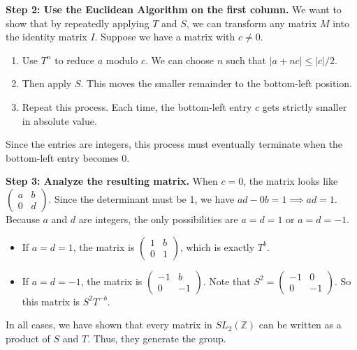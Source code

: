 \begin{solution}
\textbf{Step 2: Use the Euclidean Algorithm on the first column.}
We want to show that by repeatedly applying $T$ and $S$, we can transform any matrix $M$ into the identity matrix $I$.
Suppose we have a matrix with $c \neq 0$.
\begin{enumerate}
    \item Use $T^n$ to reduce $a$ modulo $c$. We can choose $n$ such that $|a+nc| \leq |c|/2$.
    \item Then apply $S$. This moves the smaller remainder to the bottom-left position.
    \item Repeat this process. Each time, the bottom-left entry $c$ gets strictly smaller in absolute value.
\end{enumerate}
Since the entries are integers, this process must eventually terminate when the bottom-left entry becomes $0$.

\textbf{Step 3: Analyze the resulting matrix.}
When $c=0$, the matrix looks like $\begin{pmatrix} a & b \\ 0 & d \end{pmatrix}$.
Since the determinant must be 1, we have $ad - 0b = 1 \implies ad = 1$.
Because $a$ and $d$ are integers, the only possibilities are $a=d=1$ or $a=d=-1$.
\begin{itemize}
    \item If $a=d=1$, the matrix is $\begin{pmatrix} 1 & b \\ 0 & 1 \end{pmatrix}$, which is exactly $T^b$.
    \item If $a=d=-1$, the matrix is $\begin{pmatrix} -1 & b \\ 0 & -1 \end{pmatrix}$. Note that $S^2 = \begin{pmatrix} -1 & 0 \\ 0 & -1 \end{pmatrix}$. So this matrix is $S^2 T^{-b}$.
\end{itemize}
In all cases, we have shown that every matrix in $SL_2(\mathbb{Z})$ can be written as a product of $S$ and $T$. Thus, they generate the group.
\end{solution}
